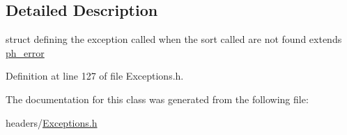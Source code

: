 \subsection{Detailed Description}
struct defining the exception called when the sort called are not found extends \hyperlink{structph__error}{ph\+\_\+error} 

Definition at line 127 of file Exceptions.\+h.



The documentation for this class was generated from the following file\+:\begin{DoxyCompactItemize}
\item 
headers/\hyperlink{Exceptions_8h}{Exceptions.\+h}\end{DoxyCompactItemize}
